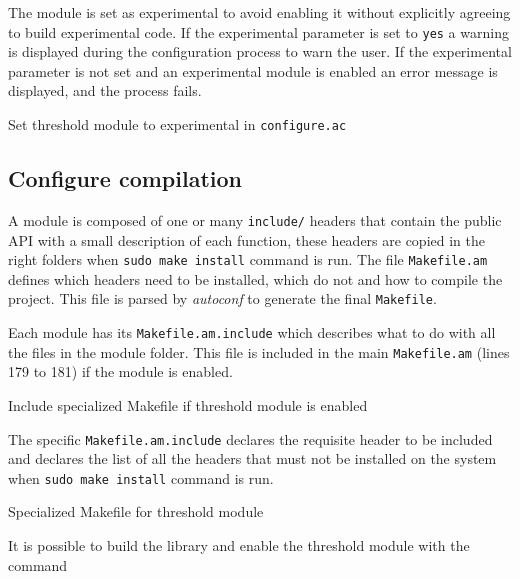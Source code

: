 The module is set as experimental to avoid enabling it without explicitly agreeing
to build experimental code. If the experimental parameter is set to \texttt{yes} a
warning is displayed during the configuration process to warn the user. If the
experimental parameter is not set and an experimental module is enabled an error
message is displayed, and the process fails.

\begin{listing}
	\caption{Set threshold module to experimental in \texttt{configure.ac}}
	\label{lst:setModuleExperimental}
\end{listing}

\subsection{Configure compilation}

A module is composed of one or many \texttt{include/} headers that contain the
public API with a small description of each function, these headers are copied
in the right folders when \texttt{sudo make install} command is run. The file
\texttt{Makefile.am} defines which headers need to be installed, which do not and
how to compile the project. This file is parsed by \textit{autoconf} to generate the
final \texttt{Makefile}.

Each module has its \texttt{Makefile.am.include} which describes what to do with
all the files in the module folder. This file is included in the main
\texttt{Makefile.am} (lines 179 to 181) if the module is enabled.

\begin{listing}
	\caption{Include specialized Makefile if threshold module is enabled}
	\label{lst:includeSpecializedMakefile}
\end{listing}

The specific \texttt{Makefile.am.include} declares the requisite header to be
included and declares the list of all the headers that must not be installed on
the system when \texttt{sudo make install} command is run.

\begin{listing}
	\caption{Specialized Makefile for threshold module}
	\label{lst:specializedMakefile}
\end{listing}

It is possible to build the library and enable the threshold module with the
command

